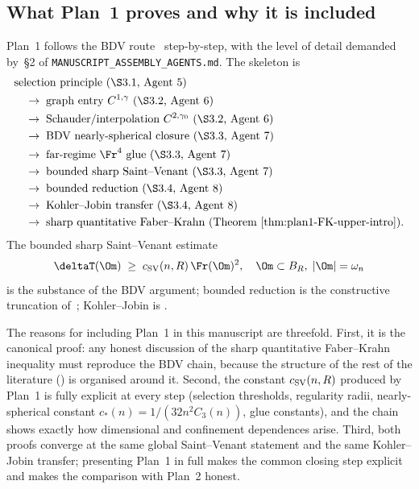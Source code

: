 \subsection{What Plan~1 proves and why it is included}
\label{ssec:intro-plan1}

Plan~1 follows the BDV route~\cite{BDV} step-by-step, with the level
of detail demanded by~\S2 of \texttt{MANUSCRIPT\_ASSEMBLY\_AGENTS.md}.
The skeleton is
\[
   \begin{aligned}
      &\text{selection principle (\S3.1, Agent~5)}\\
      &\quad\to\;\text{graph entry $C^{1,\gamma}$ (\S3.2, Agent~6)}\\
      &\quad\to\;\text{Schauder/interpolation $C^{2,\gamma_0}$ (\S3.2, Agent~6)}\\
      &\quad\to\;\text{BDV nearly-spherical closure (\S3.3, Agent~7)}\\
      &\quad\to\;\text{far-regime $\Fr^4$ glue (\S3.3, Agent~7)}\\
      &\quad\to\;\text{bounded sharp Saint--Venant (\S3.3, Agent~7)}\\
      &\quad\to\;\text{bounded reduction (\S3.4, Agent~8)}\\
      &\quad\to\;\text{Kohler--Jobin transfer (\S3.4, Agent~8)}\\
      &\quad\to\;\text{sharp quantitative Faber--Krahn (Theorem~\ref{thm:plan1-FK-upper-intro}).}
   \end{aligned}
\]
The bounded sharp Saint--Venant estimate
\[
   \deltaT(\Om)\;\ge\;c_{\rm SV}(n,R)\,\Fr(\Om)^2,
   \quad \Om\subset B_R,\;|\Om|=\omega_n
\]
is the substance of the BDV argument; bounded reduction is the
constructive truncation of~\cite[Lem.~5.3]{BDV}; Kohler--Jobin is
\cite[Thm~3.3]{Brasco2014}.

The reasons for including Plan~1 in this manuscript are threefold.
First, it is the canonical proof: any honest discussion of the sharp
quantitative Faber--Krahn inequality must reproduce the BDV chain,
because the structure of the rest of the literature
(\cite{BraDeP2017,AKN2023,BrascoPratelli2012,FuscoSurvey,Maggi2008})
is organised around it. Second, the constant
$c_{\rm SV}(n,R)$ produced by Plan~1 is fully explicit at every step
(selection thresholds, regularity radii, nearly-spherical constant
$c_*(n)=1/(32n^2 C_3(n))$, glue constants), and the chain shows
exactly how dimensional and confinement dependences arise. Third,
both proofs converge at the same global Saint--Venant statement and
the same Kohler--Jobin transfer; presenting Plan~1 in full makes the
common closing step explicit and makes the comparison with Plan~2
honest.

